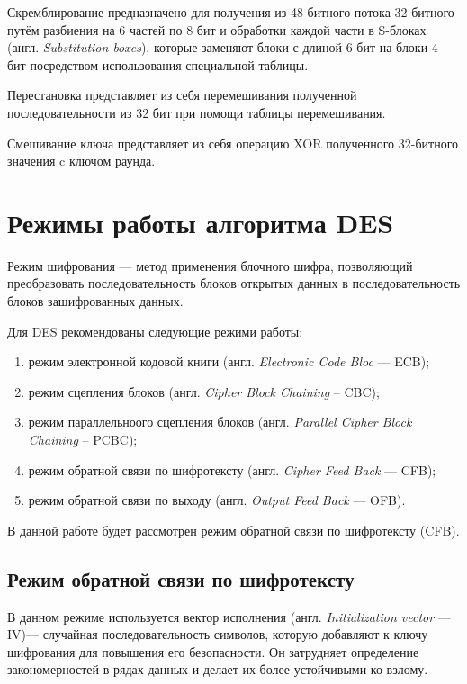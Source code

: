 Скремблирование предназначено для получения из 48-битного потока 32-битного путём разбиения на 6 частей по 8 бит и обработки каждой части в S-блоках (англ. \textit{Substitution boxes}), которые заменяют блоки с длиной 6 бит на блоки 4 бит посредством использования специальной таблицы.

Перестановка представляет из себя перемешивания полученной последовательности из 32 бит при помощи таблицы перемешивания.

Смешивание ключа представляет из себя операцию XOR полученного 32-битного значения c ключом раунда.


\section{Режимы работы алгоритма DES}

Режим шифрования --- метод применения блочного шифра, позволяющий преобразовать последовательность блоков открытых данных в последовательность блоков зашифрованных данных.

Для DES рекомендованы следующие режими работы:
\begin{enumerate}[label=\arabic*)]
	\item режим электронной кодовой книги (англ. \textit{Electronic Code Bloc} --- ECB);
    \item режим сцепления блоков (англ. \textit{Cipher Block Chaining} -- CBC);
	\item режим параллельноого сцепления блоков (англ. \textit{Parallel Cipher Block Chaining} -- PCBC);
	\item режим обратной связи по шифротексту (англ. \textit{Cipher Feed Back} --- CFB);
	\item режим обратной связи по выходу (англ. \textit{Output Feed Back} --- OFB).
\end{enumerate}

В данной работе будет рассмотрен режим обратной связи по шифротексту (CFB).

\subsection{Режим обратной связи по шифротексту}

В данном режиме используется вектор исполнения (англ. \textit{Initialization vector} --- IV)--- случайная последовательность символов, которую добавляют к ключу шифрования для повышения его безопасности. Он затрудняет определение закономерностей в рядах данных и делает их более устойчивыми ко взлому.

